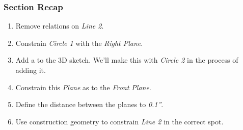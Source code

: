 \subsubsection{Section Recap}

\begin{enumerate}
\item{} Remove  relations on \emph{Line 2}.
\item{} Constrain \emph{Circle 1}  with the \emph{Right Plane}.
\item{} Add a   to the 3D sketch. We'll make this  with
\emph{Circle 2} in the process of adding it.
\item{} Constrain this \emph{Plane} as  to the \emph{Front Plane}.
\item{} Define the distance between the planes to \emph{0.1''}.
\item{} Use construction geometry to constrain \emph{Line 2} in the correct spot.
\end{enumerate}
